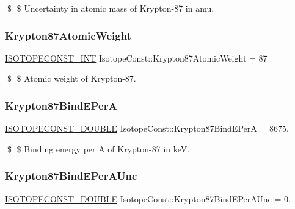 \$ \$ Uncertainty in atomic mass of Krypton-\/87 in amu. \mbox{\label{group___isotope_const-_krypton-_kr87_ga3b91e43a1209c5ae2005ceb4162a633c}} 
\subsubsection{\texorpdfstring{Krypton87\+Atomic\+Weight}{Krypton87AtomicWeight}}
{\footnotesize\ttfamily \mbox{\hyperlink{group___isotope_const-_macros_ga5f18360b3e99483a35c32d789e62621c}{I\+S\+O\+T\+O\+P\+E\+C\+O\+N\+S\+T\+\_\+\+I\+NT}} Isotope\+Const\+::\+Krypton87\+Atomic\+Weight = 87}

\$ \$ Atomic weight of Krypton-\/87. \mbox{\label{group___isotope_const-_krypton-_kr87_ga2aae06591751ae9d86ae7fe23d33fe13}} 
\subsubsection{\texorpdfstring{Krypton87\+Bind\+E\+PerA}{Krypton87BindEPerA}}
{\footnotesize\ttfamily \mbox{\hyperlink{group___isotope_const-_macros_ga8f45a7272ce02c0b4c65c44636ed719a}{I\+S\+O\+T\+O\+P\+E\+C\+O\+N\+S\+T\+\_\+\+D\+O\+U\+B\+LE}} Isotope\+Const\+::\+Krypton87\+Bind\+E\+PerA = 8675.}

\$ \$ Binding energy per A of Krypton-\/87 in keV. \mbox{\label{group___isotope_const-_krypton-_kr87_ga444a49f474c983821c62f0e704b30789}} 
\subsubsection{\texorpdfstring{Krypton87\+Bind\+E\+Per\+A\+Unc}{Krypton87BindEPerAUnc}}
{\footnotesize\ttfamily \mbox{\hyperlink{group___isotope_const-_macros_ga8f45a7272ce02c0b4c65c44636ed719a}{I\+S\+O\+T\+O\+P\+E\+C\+O\+N\+S\+T\+\_\+\+D\+O\+U\+B\+LE}} Isotope\+Const\+::\+Krypton87\+Bind\+E\+Per\+A\+Unc = 0.}

